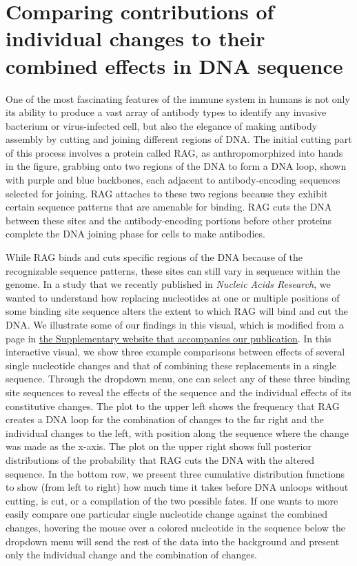 \documentclass[11pt, oneside]{article}   	%
\begin{document}
\section*{Comparing contributions of individual changes to their combined effects in DNA sequence}
\author{Griffin Chure, Soichi Hirokawa}

One of the most fascinating features of the immune system in humans is not only
its ability to produce a vast array of antibody types to identify any invasive bacterium or virus-infected cell,
but also the elegance of making antibody assembly by cutting and joining different regions of DNA. 
The initial cutting part of this process involves a protein called RAG, as anthropomorphized into hands in the figure, 
grabbing onto two regions of the DNA to form a DNA loop, shown with purple and blue backbones, each adjacent to 
antibody-encoding sequences selected for joining. RAG attaches to these two regions because they exhibit certain
sequence patterns that are amenable for binding. RAG cuts the DNA between these sites and the 
antibody-encoding portions before other proteins complete the DNA joining phase for cells to make antibodies.

While RAG binds and cuts specific regions of the DNA because of the recognizable sequence patterns, 
these sites can still vary in sequence within the genome. In a study that we 
recently published in \emph{Nucleic Acids Research}, we wanted to understand how replacing nucleotides at one or
multiple positions of some binding site sequence alters the extent to which RAG will bind
and cut the DNA. We illustrate some of our findings in this visual, which is modified from a page in 
\href{https://www.rpgroup.caltech.edu/vdj_recombination}{the Supplementary website that accompanies our publication}. 
In this interactive visual, we show three example comparisons between effects of several single nucleotide changes 
and that of combining these replacements in a single sequence. Through the dropdown menu, one can select
any of these three binding site sequences to reveal the effects of the sequence and the individual effects of its constitutive
changes. The plot to the upper left shows the frequency that RAG creates
a DNA loop for the combination of changes to the far right and the individual changes to the left, 
with position along the sequence where the change was made as the x-axis. The plot on the upper right shows full posterior
distributions of the probability that RAG cuts the DNA with the altered sequence. In the bottom row, we present three cumulative
distribution functions to show (from left to right) how much time it takes before DNA unloops without cutting, 
is cut, or a compilation of the two possible fates. If one wants to more easily compare one particular
single nucleotide change against the combined changes, hovering the mouse over a colored 
nucleotide in the sequence below the dropdown menu will send the rest of the data into the background
and present only the individual change and the combination of changes. 
\end{document}
